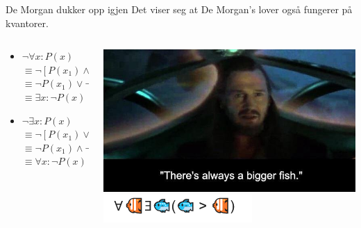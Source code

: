 \begin{frame}{De Morgan dukker opp igjen}
Det viser seg at De Morgan's lover også fungerer på kvantorer.\\
    \begin{columns}
    \begin{column}{0.48\textwidth}
    \begin{itemize}
        \item $\lnot \forall x : P(x)$ \\
        $\equiv \lnot [P(x_1) \land P(x_2) \land ... \land P(x_n)]$\\
        $\equiv \lnot P(x_1) \lor \lnot P(x_2) \lor ... \lor \lnot P(x_n)$\\ $\equiv \exists x : \lnot P(x)$
        \pause
        \item $\lnot \exists x : P(x)$\\
        $\equiv \lnot [P(x_1) \lor P(x_2) \lor ... \lor .. P(x_n)]$\\
        $\equiv \lnot P(x_1) \land \lnot P(x_2) \land ... \land \lnot P(x_n)$\\ 
        $\equiv \forall x : \lnot P(x)$
    \end{itemize}      
    \end{column}
    \pause
    \begin{column}{0.45\textwidth}
        \includegraphics[scale=0.3]{images/Always a bigger fish.jpeg}
        \pause
        \includegraphics[scale=1]{images/bigger fish.PNG}
    \end{column}
    \end{columns}
\end{frame}
